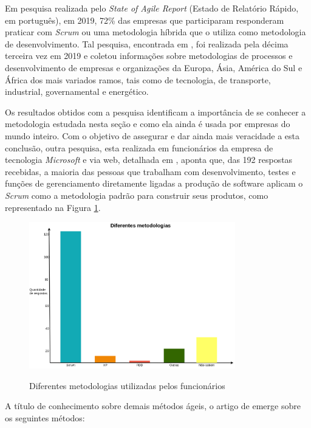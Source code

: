 Em pesquisa realizada pelo \textit{State of Agile Report} (Estado de Relatório Rápido, em português), em 2019, 72\% das empresas que participaram responderam praticar com \textit{Scrum} ou uma metodologia híbrida que o utiliza como metodologia de desenvolvimento. Tal pesquisa, encontrada em , foi realizada pela décima terceira vez em 2019 e coletou informações sobre metodologias de processos e desenvolvimento de empresas e organizações da Europa, Ásia, América do Sul e África dos mais variados ramos, tais como de tecnologia, de transporte, industrial, governamental e energético.

Os resultados obtidos com a pesquisa identificam a importância de se conhecer a metodologia estudada nesta seção e como ela ainda é usada por empresas do mundo inteiro. Com o objetivo de assegurar e dar ainda mais veracidade a esta conclusão, outra pesquisa, esta realizada em funcionários da empresa de tecnologia \textit{Microsoft} e via web, detalhada em , aponta que, das 192 respostas recebidas, a maioria das pessoas que trabalham com desenvolvimento, testes e funções de gerenciamento diretamente ligadas a produção de software aplicam o \textit{Scrum} como a metodologia padrão para construir seus produtos, como representado na Figura \ref{ageis-microsoft}. 

\begin{figure}[htb]
 \centering
 \caption{Diferentes metodologias utilizadas pelos funcionários}
 \includegraphics[width=0.8\textwidth]{figuras/diferentes-metodologias}
 \label{ageis-microsoft}
\end{figure}


A título de conhecimento sobre demais métodos ágeis, o artigo de  emerge sobre os seguintes métodos:


